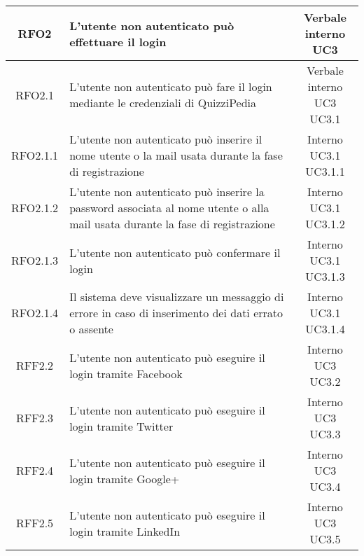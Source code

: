 \begin{longtable}{|c|>{\centering}m{7cm}|c|}
			 \hypertarget{{RFO2}}{{RFO2}} & L’utente non autenticato può effettuare il login & \makecell{Verbale interno\\ UC3 } \\ \hline
			 \hypertarget{{RFO2.1}}{{RFO2.1}} & L'utente non autenticato può fare il login mediante le credenziali di QuizziPedia & \makecell{Verbale interno\\ UC3 \\UC3.1 } \\ \hline
			 \hypertarget{{RFO2.1.1}}{{RFO2.1.1}} & L'utente non autenticato può inserire il nome utente o la mail usata durante la fase di registrazione & \makecell{Interno\\ UC3.1 \\UC3.1.1 } \\ \hline
			 \hypertarget{{RFO2.1.2}}{{RFO2.1.2}} & L'utente non autenticato può inserire la password associata al nome utente o alla mail usata durante la fase di registrazione & \makecell{Interno\\ UC3.1 \\UC3.1.2 } \\ \hline
			 \hypertarget{{RFO2.1.3}}{{RFO2.1.3}} & L'utente non autenticato può confermare il login & \makecell{Interno\\ UC3.1 \\UC3.1.3 } \\ \hline
			 \hypertarget{{RFO2.1.4}}{{RFO2.1.4}} & Il sistema deve visualizzare un messaggio di errore in caso di inserimento dei dati errato o assente & \makecell{Interno\\ UC3.1 \\UC3.1.4 } \\ \hline
			 \hypertarget{{RFF2.2}}{{RFF2.2}} & L'utente non autenticato può eseguire il login tramite Facebook & \makecell{Interno\\ UC3 \\UC3.2 } \\ \hline
			 \hypertarget{{RFF2.3}}{{RFF2.3}} & L'utente non autenticato può eseguire il login tramite Twitter & \makecell{Interno\\ UC3 \\UC3.3 } \\ \hline
			 \hypertarget{{RFF2.4}}{{RFF2.4}} & L'utente non autenticato può eseguire il login tramite Google+ & \makecell{Interno\\ UC3 \\UC3.4 } \\ \hline
			 \hypertarget{{RFF2.5}}{{RFF2.5}} & L'utente non autenticato può eseguire il login tramite LinkedIn & \makecell{Interno\\ UC3 \\UC3.5 } \\ \hline

\end{longtable}
